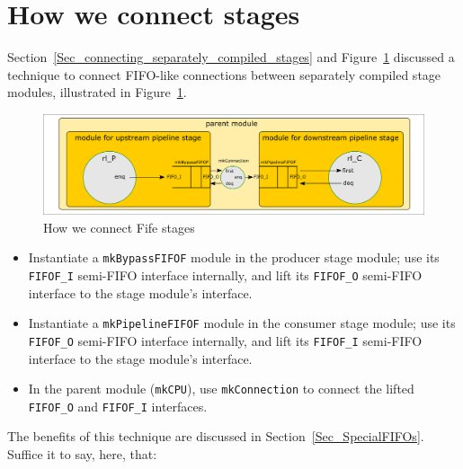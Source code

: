 \section{How we connect stages}

\label{Sec_Fife_connections}

Section~\ref{Sec_connecting_separately_compiled_stages} and
Figure~\ref{Fig_Fife_connections} discussed a technique to connect
FIFO-like connections between separately compiled stage modules,
illustrated in Figure~\ref{Fig_Fife_connections}.
\begin{figure}[htbp]
  \centerline{\includegraphics[width=6in,angle=0]{Figures/Fig_Composed_FIFO_modularity}}
  \caption{\label{Fig_Fife_connections}
           How we connect Fife stages}
\end{figure}

\begin{itemize}

 \item Instantiate a {\tt mkBypassFIFOF} module in the producer stage
       module; use its {\tt FIFOF\_I} semi-FIFO interface internally,
       and lift its {\tt FIFOF\_O} semi-FIFO interface to the stage
       module's interface.

 \item Instantiate a {\tt mkPipelineFIFOF} module in the consumer stage
       module; use its {\tt FIFOF\_O} semi-FIFO interface internally,
       and lift its {\tt FIFOF\_I} semi-FIFO interface to the stage
       module's interface.

 \item In the parent module ({\tt mkCPU}), use {\tt mkConnection} to
       connect the lifted {\tt FIFOF\_O} and {\tt FIFOF\_I}
       interfaces.

\end{itemize}

The benefits of this technique are discussed in
Section~\ref{Sec_SpecialFIFOs}.  Suffice it to say, here, that:

